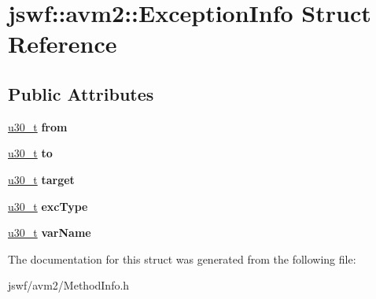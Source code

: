 \hypertarget{structjswf_1_1avm2_1_1_exception_info}{\section{jswf\+:\+:avm2\+:\+:Exception\+Info Struct Reference}
\label{structjswf_1_1avm2_1_1_exception_info}
}
\subsection*{Public Attributes}
\begin{DoxyCompactItemize}
\item 
\hypertarget{structjswf_1_1avm2_1_1_exception_info_a4ef6047a684a72cc1401449bec2a9562}{\hyperlink{namespacejswf_aa10d9ddca2a6a5debdc261dfae3d1117}{u30\+\_\+t} {\bfseries from}}\label{structjswf_1_1avm2_1_1_exception_info_a4ef6047a684a72cc1401449bec2a9562}

\item 
\hypertarget{structjswf_1_1avm2_1_1_exception_info_ac75072705ac36ad1756d76711df5f85d}{\hyperlink{namespacejswf_aa10d9ddca2a6a5debdc261dfae3d1117}{u30\+\_\+t} {\bfseries to}}\label{structjswf_1_1avm2_1_1_exception_info_ac75072705ac36ad1756d76711df5f85d}

\item 
\hypertarget{structjswf_1_1avm2_1_1_exception_info_ad406c052645131d062ba8361f64f8b31}{\hyperlink{namespacejswf_aa10d9ddca2a6a5debdc261dfae3d1117}{u30\+\_\+t} {\bfseries target}}\label{structjswf_1_1avm2_1_1_exception_info_ad406c052645131d062ba8361f64f8b31}

\item 
\hypertarget{structjswf_1_1avm2_1_1_exception_info_aeca3c60721a72c2d4bd7405dd105edd1}{\hyperlink{namespacejswf_aa10d9ddca2a6a5debdc261dfae3d1117}{u30\+\_\+t} {\bfseries exc\+Type}}\label{structjswf_1_1avm2_1_1_exception_info_aeca3c60721a72c2d4bd7405dd105edd1}

\item 
\hypertarget{structjswf_1_1avm2_1_1_exception_info_a1e01c3337cb192b9901fb64223b3f215}{\hyperlink{namespacejswf_aa10d9ddca2a6a5debdc261dfae3d1117}{u30\+\_\+t} {\bfseries var\+Name}}\label{structjswf_1_1avm2_1_1_exception_info_a1e01c3337cb192b9901fb64223b3f215}

\end{DoxyCompactItemize}


The documentation for this struct was generated from the following file\+:\begin{DoxyCompactItemize}
\item 
jswf/avm2/Method\+Info.\+h\end{DoxyCompactItemize}
